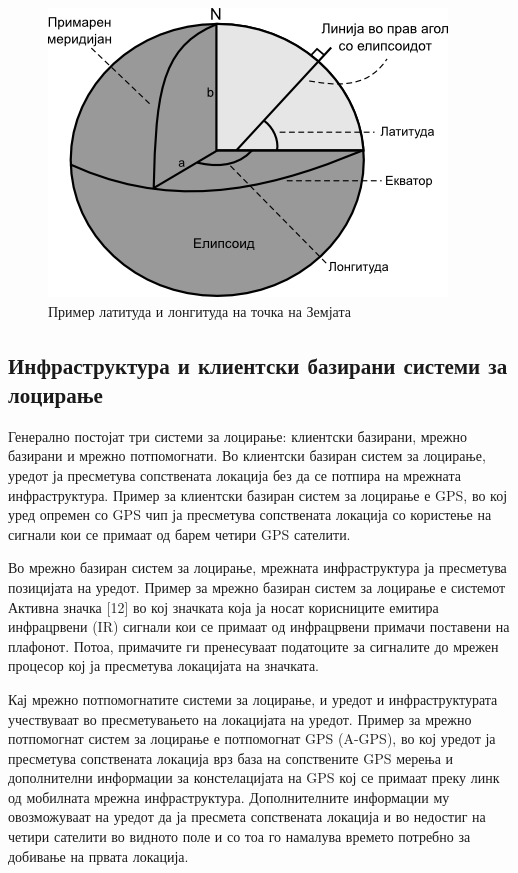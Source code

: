 \begin{figure}[htb]
\centering
\includegraphics[scale=0.4]{images/gps_coordinates}
\caption{Пример латитуда и лонгитуда на точка на Земјата}
\label{fig:gps_coordinates}
\end{figure}

 
\subsection{Инфраструктура и клиентски базирани системи за лоцирање} 

Генерално постојат три системи за лоцирање: клиентски базирани, мрежно базирани
и мрежно потпомогнати. Во клиентски базиран систем за лоцирање, уредот ја
пресметува сопствената локација без да се потпира на мрежната инфраструктура.
Пример за клиентски базиран систем за лоцирање е GPS, во кој уред опремен со GPS
чип ја пресметува сопствената локација со користење на сигнали кои се примаат од
барем четири GPS сателити.

Во
мрежно базиран систем за лоцирање, мрежната инфраструктура ја пресметува
позицијата на уредот. Пример за мрежно базиран систем за лоцирање е системот
Активна значка [12] во кој значката која ја носат корисниците емитира
инфрацрвени (IR) сигнали кои се примаат од инфрацрвени примачи поставени на
плафонот. Потоа, примачите ги пренесуваат податоците за сигналите до мрежен
процесор кој ја пресметува локацијата на значката. 

Кај мрежно потпомогнатите
системи за лоцирање, и уредот и инфраструктурата учествуваат во пресметувањето
на локацијата на уредот. Пример за мрежно потпомогнат систем за лоцирање е
потпомогнат GPS (A-GPS), во кој уредот ја пресметува сопствената локација врз
база на сопствените GPS мерења и дополнителни информации за констелацијата на
GPS кој се примаат преку линк од мобилната мрежна инфраструктура. Дополнителните
информации му овозможуваат на уредот да ја пресмета сопствената локација и во
недостиг на четири сателити во видното поле и со тоа го намалува времето
потребно за добивање на првата локација. 

